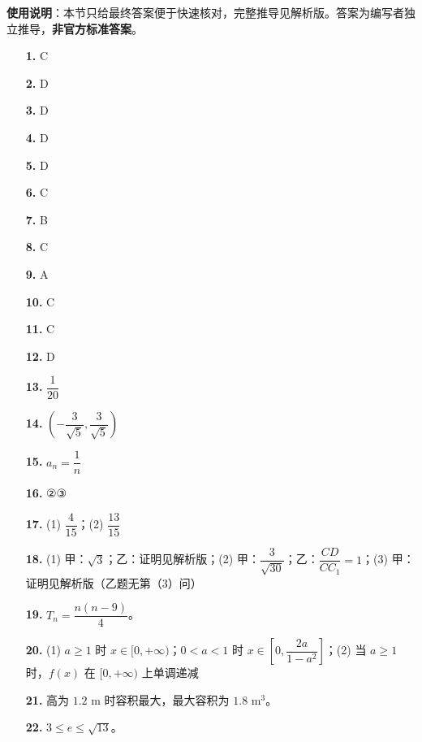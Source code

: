 
\begin{gknotice}
\textbf{使用说明}：本节只给最终答案便于快速核对，完整推导见解析版。答案为编写者独立推导，\textbf{非官方标准答案}。
\end{gknotice}

\begin{itemize}[leftmargin=2.6em]
  \item[\textbf{1.}] C
  \item[\textbf{2.}] D
  \item[\textbf{3.}] D
  \item[\textbf{4.}] D
  \item[\textbf{5.}] D
  \item[\textbf{6.}] C
  \item[\textbf{7.}] B
  \item[\textbf{8.}] C
  \item[\textbf{9.}] A
  \item[\textbf{10.}] C
  \item[\textbf{11.}] C
  \item[\textbf{12.}] D
  \item[\textbf{13.}] $\dfrac1{20}$
  \item[\textbf{14.}] $\left(-\dfrac3{\sqrt5},\dfrac3{\sqrt5}\right)$
  \item[\textbf{15.}] $a_n=\dfrac1n$
  \item[\textbf{16.}] ②③
  \item[\textbf{17.}] (1) $\dfrac4{15}$；(2) $\dfrac{13}{15}$
  \item[\textbf{18.}] (1) 甲：$\sqrt3$；乙：证明见解析版；(2) 甲：$\dfrac3{\sqrt{30}}$；乙：$\dfrac{CD}{CC_1}=1$；(3) 甲：证明见解析版（乙题无第（3）问）
  \item[\textbf{19.}] $T_n=\dfrac{n(n-9)}4$。
  \item[\textbf{20.}] (1) $a\ge1$ 时 $x\in[0,+\infty)$；$0<a<1$ 时 $x\in\left[0,\dfrac{2a}{1-a^2}\right]$；(2) 当 $a\ge1$ 时，$f(x)$ 在 $[0,+\infty)$ 上单调递减
  \item[\textbf{21.}] 高为 $1.2$ m 时容积最大，最大容积为 $1.8$ m$^3$。
  \item[\textbf{22.}] $3\le e\le\sqrt{13}$。
\end{itemize}

